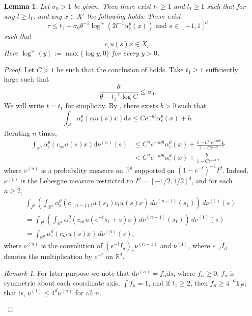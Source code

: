 \documentclass[12pt,reqno]{amsart}
\numberwithin{equation}{section}
\theoremstyle{plain}
\newtheorem{lem}[thm]{Lemma}
\theoremstyle{definition}
\theoremstyle{remark}
\newtheorem{remark}{Remark}[section]
\newcommand{\R}{\mathbb{R}}
\newcommand{\eps}{\varepsilon}
\newcommand{\de}{\mathrm{d}}
\begin{document}
\begin{lem} \label{lem:back to compact}
        Let $\sigma_0>1$ be given. Then there exist $t_1\geq 1$ and $l_1\geq 1$ such that for any $l\geq l_1$, and any $x\in X'$ the following holds: There exist 
        \[
        \tau\leq t_1+\sigma_0\theta^{-1}\log^+ (2l^{-1}\alpha_\eps^\theta(x)) \text{ and } s\in [-1,1]^d
        \]
        such that
        \[
        c_{\tau}u(s)x \in X_l.  
        \]
        Here $\log^+(y):=\max\{ \log y,0 \}$ for every $y>0$.
    \end{lem}
    \begin{proof}
       Let $C>1$ be such that the conclusion of  holds. Take $t_1\geq 1$ sufficiently large such that 
        \[
        \frac{\theta}{\theta-t_1^{-1}\log C}\leq\sigma_0.
        \]
        We will write $t=t_1$ for simplicity. By , there exists $b>0$ such that 
        \[
        \int_{I^d}\alpha_\eps^{\theta}(c_tu(s)x)\de s\leq
		Ce^{-\theta t}\alpha_\eps^{\theta}(x)+b.
        \]
        Iterating $n$ times,
        \begin{equation} \label{eq:exponential contraction}
        \begin{split}
            \int_{\R^d}\alpha_\eps^{\theta}(c_{nt}u(s)x)\de \nu^{(n)}(s)
            &\leq C^ne^{-n\theta t}\alpha_\eps^{\theta}(x)+\frac{1-C^ne^{-n\theta t}}{1-Ce^{-\theta t}}b \\
            &< C^ne^{-n\theta t}\alpha_\eps^{\theta}(x)+\frac{b}{1-Ce^{-\theta t}},
        \end{split}    
        \end{equation}
        where $\nu^{(n)}$ is a probability measure on $\R^d$ supported on $(1-e^{-t})^{-1}I^d$. Indeed, $\nu^{(1)}$ is the Lebesgue measure restricted to $I^d=[-1/2,1/2]^d$, and for each $n\geq 2$,
        \begin{align*}
&\int_{I^d}\left(\int_{\R^d}\alpha_\eps^\theta(c_{(n-1)t}u(s_1)c_{t}u(s)x)\,d\nu^{(n-1)}(s_1)\right)\,d\nu^{(1)}(s)\\
&=\int_{I^d}\left(\int_{\R^d}\alpha_\eps^\theta(c_{nt}u(e^{-t}s_1+s)x)\,d\nu^{(n-1)}(s_1)\right)\,d\nu^{(1)}(s)\\
&=\int_{\R^d}\alpha_\eps^{\theta}(c_{nt}u(s)x)\,d\nu^{(n)}(s),
\end{align*}
    where $\nu^{(n)}$ is the convolution of $(e^{-t}I_d)_\ast \nu^{(n-1)}$ and $\nu^{(1)}$, where $e_{-t}I_d$ denotes the multiplication by $e^{-t}$ on $\R^d$. 

    \begin{remark} \label{rem:nu*n}
       For later purpose we note that $\de\nu^{(n)}=f_n\de s$, where $f_n\geq 0$, $f_n$ is symmetric about each coordinate axis, $\int f_n=1$, and if $t_1\geq 2$, then $f_n\geq 4^{-d}\mathbf{1}_{I^d}$; that is, $\nu^{(1)}\leq 4^d\nu^{(n)}$ for all $n$.  
    \end{remark}
        

\end{proof}
\end{document}
